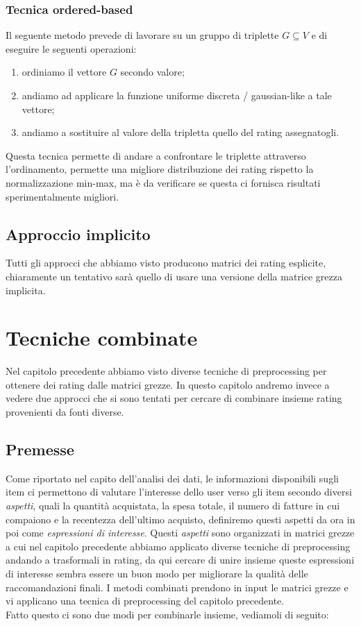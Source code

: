 \subsubsection{Tecnica ordered-based}
Il seguente metodo prevede di lavorare su un gruppo di triplette $G \subseteq V$ e di eseguire le seguenti operazioni:
\begin{enumerate}
    \item ordiniamo il vettore $G$ secondo valore;
    \item andiamo ad applicare la funzione uniforme discreta / gaussian-like a tale vettore;
    \item andiamo a sostituire al valore della tripletta quello del rating assegnatogli.
\end{enumerate}

Questa tecnica permette di andare a confrontare le triplette attraverso l'ordinamento, permette una migliore distribuzione dei rating rispetto la normalizzazione min-max, ma è da verificare se questa ci fornisca risultati sperimentalmente migliori.

\subsection{Approccio implicito}
Tutti gli approcci che abbiamo visto producono matrici dei rating esplicite, chiaramente un tentativo sarà quello di usare una versione della matrice grezza implicita.

\section{Tecniche combinate}
Nel capitolo precedente abbiamo visto diverse tecniche di preprocessing per ottenere dei rating dalle matrici grezze.
In questo capitolo andremo invece a vedere due approcci che si sono tentati per cercare di combinare insieme rating provenienti da fonti diverse.
\subsection{Premesse}
Come riportato nel capito dell'analisi dei dati, le informazioni disponibili sugli item ci permettono di valutare l'interesse dello user verso gli item secondo diversi \textit{aspetti}, quali la quantità acquistata, la spesa totale, il numero di fatture in cui compaiono e la recentezza dell'ultimo acquisto, definiremo questi aspetti da ora in poi come \textit{espressioni di interesse}.
Questi \textit{aspetti} sono organizzati in matrici grezze a cui nel capitolo precedente abbiamo applicato diverse tecniche di preprocessing andando a trasformali in rating, da qui cercare di unire insieme queste espressioni di interesse sembra essere un buon modo per migliorare la qualità delle raccomandazioni finali.
I metodi combinati prendono in input le matrici grezze e vi applicano una tecnica di preprocessing del capitolo precedente.\\
Fatto questo ci sono due modi per combinarle insieme, vediamoli di seguito:


